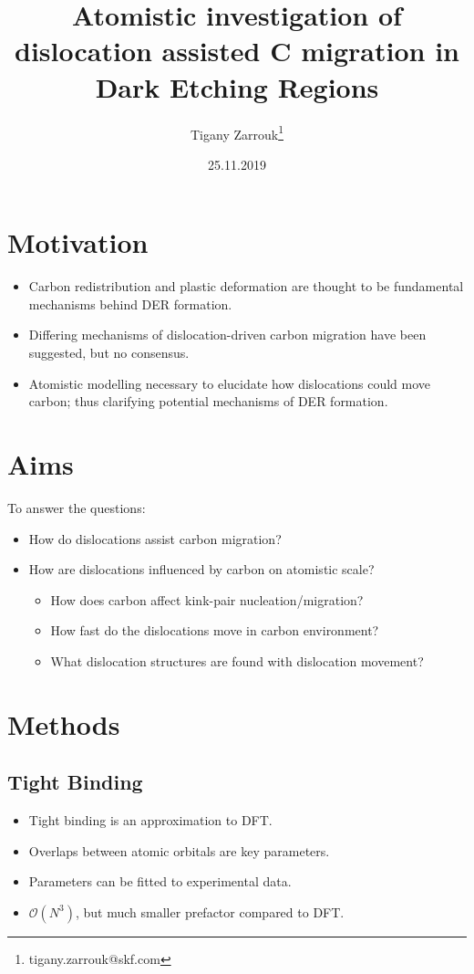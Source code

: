 \documentclass[11pt]{article}
\author{Tigany Zarrouk\thanks{tigany.zarrouk@skf.com}}
\date{25.11.2019}
\title{Atomistic investigation of dislocation assisted C migration in Dark Etching Regions}
\begin{document}
\maketitle



\section*{Motivation}
\label{sec:orgb765987}
\begin{itemize}
\item Carbon redistribution and plastic deformation are thought to be
fundamental mechanisms behind DER formation.
\item Differing mechanisms of dislocation-driven carbon migration have
been suggested, but no consensus.
\item Atomistic modelling necessary to elucidate how dislocations could
move carbon; thus clarifying potential mechanisms of DER
formation.
\end{itemize}

\section*{Aims}
\label{sec:orgfe7d825}
To answer the questions:
\begin{itemize}
\item How do dislocations assist carbon migration?
\item How are dislocations influenced by carbon on atomistic scale?
\begin{itemize}
\item How does carbon affect kink-pair nucleation/migration?
\item How fast do the dislocations move in carbon environment?
\item What dislocation structures are found with dislocation movement?
\end{itemize}
\end{itemize}

\section*{Methods}
\label{sec:orgc3e048c}

\subsection*{Tight Binding}
\label{sec:orgc72b5dd}


\begin{itemize}
\item Tight binding is an approximation to DFT.
\item Overlaps between atomic orbitals are key parameters.
\item Parameters can be fitted to experimental data.
\item \(\mathcal{O}(N^3)\), but much smaller prefactor compared to DFT.
\end{itemize}
\end{document}
